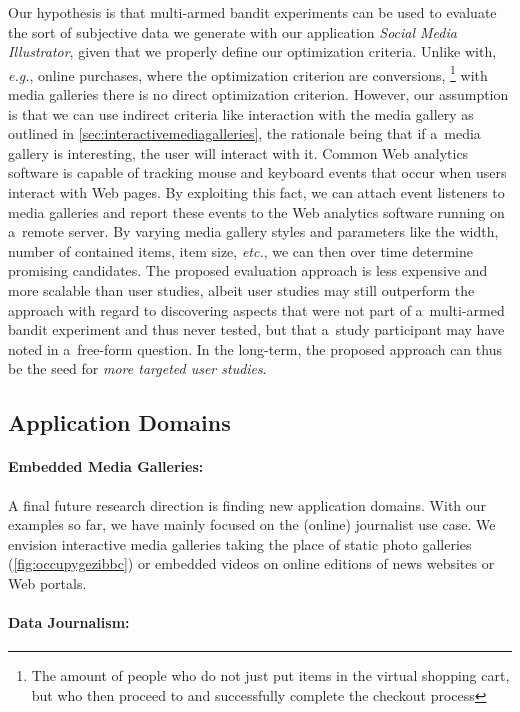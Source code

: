 Our hypothesis is that multi-armed bandit experiments can be used 
to evaluate the sort of subjective data we generate
with our application \emph{Social Media Illustrator}, given that we 
properly define our optimization criteria.
Unlike with, \emph{e.g.}, online purchases,
where the optimization criterion are conversions,%
\footnote{The amount of people who do not just put items in the virtual shopping cart,
but who then proceed to and successfully complete the checkout process}
with media galleries there is no direct optimization criterion.
However, our assumption is that we can use indirect criteria like
interaction with the media gallery
as outlined in \autoref{sec:interactivemediagalleries},
the rationale being that if
a~media gallery is interesting, the user will interact with it.
Common Web analytics software is capable of tracking mouse and
keyboard events that occur when users interact with Web pages.
By exploiting this fact, we can attach event listeners
to media galleries and report these events
to the Web analytics software running on a~remote server.
By varying media gallery styles and parameters like the width,
number of contained items, item size, \emph{etc.},
we can then over time determine promising candidates.
The proposed evaluation approach is less expensive
and more scalable than user studies,
albeit user studies may still outperform the approach
with regard to discovering aspects that were not part
of a~multi-armed bandit experiment and thus never tested,
but that a~study participant may have noted in a~free-form question.
In the long-term, the proposed approach
can thus be the seed for \emph{more targeted user studies}.

\subsection{Application Domains}

\paragraph{Embedded Media Galleries:}

A final future research direction is finding new application domains.
With our examples so far, we have mainly focused
on the (online) journalist use case.
We envision interactive media galleries taking the place
of static photo galleries (\autoref{fig:occupygezibbc})
or embedded videos on online editions
of news websites or Web portals.

\paragraph{Data Journalism:}

